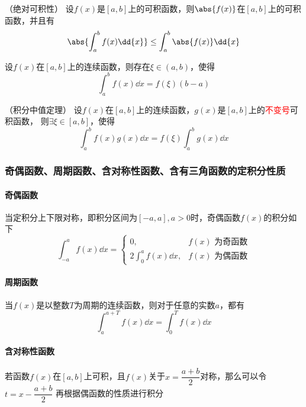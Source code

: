 \begin{theorem}
    （绝对可积性）
    \label{th:绝对可积性}
    设$f(x)$是$[a,b]$上的可积函数，则$\abs{f(x)}$在$[a,b]$上的可积函数，并且有
    \[ \abs{\int_a^b f(x)\dd{x}} \leq \int_a^b \abs{f(x)} \dd{x} \]
\end{theorem}

\begin{theorem}
    设$f(x)$在$[a,b]$上的连续函数，则存在$\xi\in(a,b)$，使得
    \[ \int_a^b f(x)\dd{x} = f(\xi)(b-a) \]
\end{theorem}

\begin{theorem}
    （积分中值定理）
    \label{th:积分中值定理}
    设$f(x)$在$[a,b]$上的连续函数，$g(x)$是$[a,b]$上的\textcolor{red}{不变号}可积函数，
    则$\exists \xi\in[a,b]$，使得
    \[ \int_a^b f(x)g(x)\dd{x} = f(\xi)\int_a^b g(x)\dd{x} \]
\end{theorem}

\subsubsection{奇偶函数、周期函数、含对称性函数、含有三角函数的定积分性质}
\paragraph{奇偶函数}
当定积分上下限对称，即积分区间为$[-a,a],a>0$时，奇偶函数$f(x)$的积分如下
\[
    \int_{-a}^a f(x)\dd{x} =
    \begin{cases}
        0,                   & f(x)\text{ 为奇函数} \\
        2\int_0^af(x)\dd{x}, & f(x)\text{ 为偶函数}
    \end{cases}
\]

\paragraph{周期函数}
当$f(x)$是以整数$T$为周期的连续函数，则对于任意的实数$a$，都有
\[\int_a^{a+T}f(x)\dd{x} = \int_0^T f(x)\dd{x} \]

\paragraph{含对称性函数}
若函数$f(x)$在$[a,b]$上可积，且$f(x)$关于$x=\dfrac{a+b}{2}$对称，那么可以令$t=x-\dfrac{a+b}{2}$
再根据偶函数的性质进行积分


